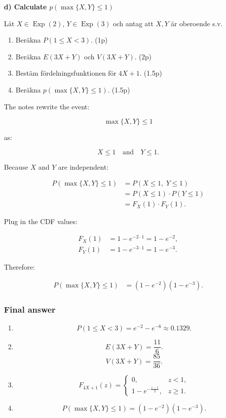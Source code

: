 \documentclass[10pt]{article}
\begin{document}
\textbf{d) Calculate \(p(\max\{X,Y\}\leq 1)\)}

Låt \(X \in \operatorname{Exp}(2)\),
\(Y \in \operatorname{Exp}(3)\) och antag att
\(X, Y\) är oberoende s.v.

\begin{enumerate}[label=\alph*)]
\item Beräkna \(P(1 \leq X < 3)\). \hfill (1p)
\item Beräkna \(E(3X+Y)\) och \(V(3X+Y)\). \hfill (2p)
\item Bestäm fördelningsfunktionen för \(4X+1\). \hfill (1.5p)
\item Beräkna \(p(\max\{X,Y\}\leq 1)\). \hfill (1.5p)
\end{enumerate}

The notes rewrite the event:

\[
\max\{X,Y\}\leq 1
\]

as:

\[
X\leq 1
\quad \text{and} \quad
Y\leq 1.
\]

Because \(X\) and \(Y\) are independent:

\begin{align*}
P(\max\{X,Y\}\leq 1)
&=P(X\leq 1,\;Y\leq 1) \\[2mm]
&=P(X\leq 1)\cdot P(Y\leq 1) \\[2mm]
&=F_X(1)\cdot F_Y(1).
\end{align*}

Plug in the CDF values:

\begin{align*}
F_X(1)
&=1-e^{-2\cdot 1}
=1-e^{-2},
\\[2mm]
F_Y(1)
&=1-e^{-3\cdot 1}
=1-e^{-3}.
\end{align*}

Therefore:

\begin{align*}
P(\max\{X,Y\}\leq 1)
&=(1-e^{-2})(1-e^{-3}).
\end{align*}

\subsubsection*{Final answer}
\begin{enumerate}[label=\alph*)]
\item
\[
P(1\leq X<3)
=e^{-2}-e^{-6}
\approx 0.1329.
\]

\item
\[
E(3X+Y)=\frac{11}{6}.
\]
\[
V(3X+Y)=\frac{85}{36}.
\]

\item
\[
F_{4X+1}(z)=
\begin{cases}
0, & z<1,\\[1mm]
1-e^{-\frac{z-1}{2}},
& z\geq 1.
\end{cases}
\]

\item
\[
P(\max\{X,Y\}\leq 1)
=(1-e^{-2})(1-e^{-3}).
\]
\end{enumerate}
\end{document}
